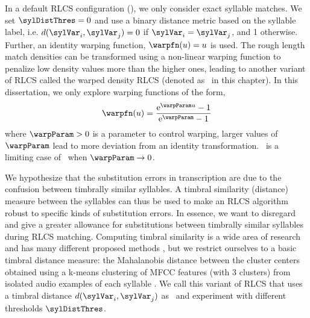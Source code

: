 In a default \gls{RLCS} configuration (\rlcso), we only consider exact syllable matches. We set $\sylDistThres = 0$ and use a binary distance metric based on the syllable label, i.e. $d(\sylVar_i,\sylVar_j) = 0$ if $\sylVar_i = \sylVar_j$, and 1 otherwise. Further, an identity warping function, $\warpfn(u) = u$ is used. The rough length match densities can be transformed using a non-linear warping function to penalize low density values more than the higher ones, leading to another variant of \gls{RLCS} called the warped density \gls{RLCS} (denoted as \rlcss\ in this chapter). In this dissertation, we only explore warping functions of the form, 
\begin{equation}\label{eq:rlcs:warp}
\warpfn(u) = \frac{\mathrm{e}^{\warpParam u}-1}{\mathrm{e}^{\warpParam}-1}
\end{equation}
where $\warpParam > 0$ is a parameter to control warping, larger values of $\warpParam$ lead to more deviation from an identity transformation. \rlcso\ is a limiting case of \rlcss\ when $\warpParam \rightarrow 0$. 

We hypothesize that the substitution errors in transcription are due to the confusion between timbrally similar syllables. A timbral similarity (distance) measure between the syllables can thus be used to make an \gls{RLCS} algorithm robust to specific kinds of substitution errors. In essence, we want to disregard and give a greater allowance for substitutions between timbrally similar syllables during \gls{RLCS} matching. Computing timbral similarity is a wide area of research and has many different proposed methods \cite{pachet:04:similarity}, but we restrict ourselves to a basic timbral distance measure: the Mahalanobis distance between the cluster centers obtained using a k-means clustering of \gls{MFCC} features (with 3 clusters) from isolated audio examples of each syllable \cite{aucouturier:02:similarity}. We call this variant of \gls{RLCS} that uses a timbral distance $d(\sylVar_i,\sylVar_j)$ as \rlcsd\ and experiment with different thresholds $\sylDistThres$. %
%
